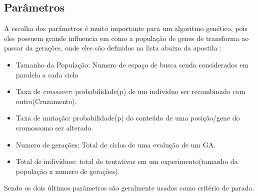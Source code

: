 \subsection{Parâmetros}
 A escolha dos parâmetros é muito importante para um algoritmo genético, pois eles possuem grande influencia em como a população de genes de transforma ao passar da gerações, onde eles são definidos na lista abaixo da apostila \cite{algo_genetics_principios}:\newline
\begin{itemize}
\item
    Tamanho da População: Numero de espaço de busca sendo considerados em paralelo a cada ciclo
\item
    Taxa de \textit{crossover}: probabilidade(p) de um individuo ser recombinado com outro(Cruzamento).
\item
    Taxa de mutação: probabilidade(p) do conteúdo de uma posição/gene do cromossomo ser alterado.
\item
    Numero de gerações: Total de ciclos de uma evolução de um GA.
\item
    Total de indivíduos: total de tentativas em um experimento(tamanho da população x numero de gerações).
\end{itemize}

Sendo os dois últimos parâmetros são geralmente usados como critério de parada.

